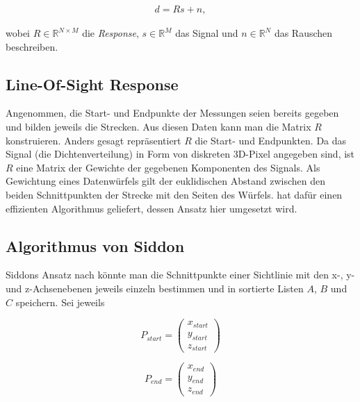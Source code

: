 \begin{equation}
  \label{k4.2.ct.3d.datamodel}
  \begin{aligned}
    d = Rs + n,
  \end{aligned}
\end{equation}

wobei $R \in \mathbb{R}^{N \times M}$ die \emph{Response}, $s \in \mathbb{R}^M$ das Signal und $n \in \mathbb{R}^N$ das Rauschen beschreiben. 

\subsection{Line-Of-Sight Response}\label{k4.2.ct.resp}

Angenommen, die Start- und Endpunkte der Messungen seien bereits gegeben und bilden jeweils die Strecken. Aus diesen Daten kann man die Matrix $R$ konstruieren. Anders gesagt repräsentiert $R$ die Start- und Endpunkten. Da das Signal (die Dichtenverteilung) in Form von diskreten 3D-Pixel angegeben sind, ist $R$ eine Matrix der Gewichte der gegebenen Komponenten des Signals. Als Gewichtung eines Datenwürfels gilt der euklidischen Abstand zwischen den beiden Schnittpunkten der Strecke mit den Seiten des Würfels. \textcite{k4.2.siddon} hat dafür einen effizienten Algorithmus geliefert, dessen Ansatz hier umgesetzt wird.


\subsection{Algorithmus von Siddon}\label{k4.2.ct.siddon}

Siddons Ansatz nach könnte man die Schnittpunkte einer Sichtlinie mit den x-, y- und z-Achsenebenen jeweils einzeln bestimmen und in sortierte Listen $A$, $B$ und $C$ speichern. Sei jeweils

\begin{equation}
  P_{start} = \begin{pmatrix}x_{start} \\ y_{start} \\ z_{start}\end{pmatrix}
\end{equation}

\begin{equation}
  P_{end} = \begin{pmatrix}x_{end} \\ y_{end} \\ z_{end}\end{pmatrix}
\end{equation}

